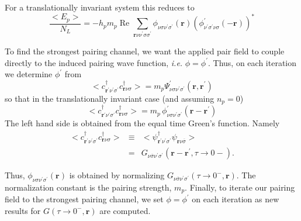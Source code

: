 For a translationally invariant system this reduces to
\begin{equation}
\frac{<E_p>}{N_L}  =  - 
h_p m_p\;\textrm{Re } \sum_{\mathbf{r}\nu\nu^{\prime}\sigma\sigma^{\prime}}
    \phi_{\nu\sigma\nu^{\prime}\sigma^{\prime}}(\mathbf{r}) 
\left(\phi^{\prime}_{\nu^{\prime}\sigma^{\prime}\nu\sigma}(-\mathbf{r})\right)^* 
\end{equation}

To find the strongest pairing channel, we want the applied
pair field to couple directly to the induced pairing wave function,
\textit{i.e.} $\phi = \phi^{\prime}$.  Thus, on each iteration
we determine $\phi^{\prime}$ from
\begin{equation}
<c^{\dagger}_{\mathbf{r}^{\prime}\nu^{\prime}\sigma^{\prime}} 
c^{\dagger}_{\mathbf{r}\nu\sigma}> = 
m_p \Psi^{\prime}_{\nu\sigma\nu^{\prime}\sigma^{\prime}}(\mathbf{r},\mathbf{r}^{\prime})
\end{equation}
so that in the translationally invariant case (and assuming
$n_p = 0$)
\begin{equation} 
<c^{\dagger}_{\mathbf{r}^{\prime}\nu^{\prime}\sigma^{\prime}} 
c^{\dagger}_{\mathbf{r}\nu\sigma}>  =  m_p 
\,\phi_{\nu\sigma\nu^{\prime}\sigma^{\prime}}^{\prime}(\mathbf{r} -
\mathbf{r}^{\prime}) 
\end{equation}
The left hand side is obtained from the equal time Green's
function.  Namely
\begin{eqnarray} 
<c^{\dagger}_{\mathbf{r}^{\prime}\nu^{\prime}\sigma^{\prime}} 
c^{\dagger}_{\mathbf{r}\nu\sigma}> & \equiv &
<\psi^{\dagger}_{\mathbf{r}^{\prime}\nu^{\prime}\sigma^{\prime}}
\psi_{\mathbf{r}\nu\overline{\sigma}}> \\
& = & 
G_{\nu\overline{\sigma}\nu^{\prime}\sigma^{\prime}}(\mathbf{r}-\mathbf{r}^{\prime},
\tau \to 0-).
\end{eqnarray}

Thus, $\phi_{\nu\sigma\nu^{\prime}\sigma^{\prime}}(\mathbf{r})$ 
is obtained by normalizing  
$G_{\nu\overline{\sigma}\nu^{\prime}\sigma^{\prime}}(\tau \to 0^-, \mathbf{r})$.
The normalization constant is the pairing strength, $m_p$.
Finally, to iterate our pairing field 
to the strongest pairing channel, we set
$\phi = \phi^{\prime}$ on each iteration
as new results for $G(\tau \to 0^-, \mathbf{r})$
are computed.  
